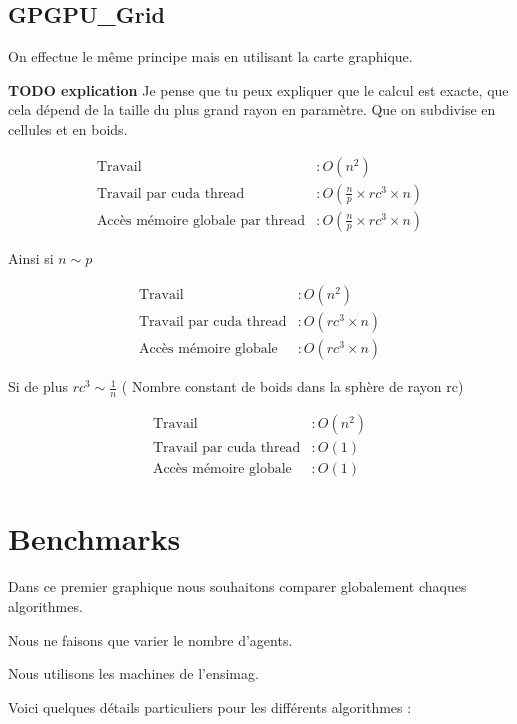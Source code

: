 \documentclass[liens,entete-ensimag,margeCorrection]{ensirapport}
\begin{document}
\subsection{GPGPU\_Grid}
On effectue le même principe mais en utilisant la carte graphique.


\textbf{TODO explication}
Je pense que tu peux expliquer que le calcul est exacte, que cela dépend de la taille du plus grand rayon en paramètre.
Que on subdivise en cellules et en boids.


\begin{align*}
    \text{Travail} &: O\left( n^2 \right) \\
    \text{Travail par cuda thread} &: O\left( \frac n p \times rc^3 \times n \right)  \\
    \text{Accès mémoire globale par thread} &: O\left( \frac n p \times rc^3 \times n \right)
\end{align*}

Ainsi si $n \sim p$

\begin{align*}
    \text{Travail} &: O\left( n^2 \right) \\
    \text{Travail par cuda thread} &: O\left( rc^3 \times n \right)  \\
    \text{Accès mémoire globale} &: O\left( rc^3 \times n \right)
\end{align*}

Si de plus  $ rc^3 \sim \frac 1n$  ( Nombre constant de boids dans la sphère de rayon rc)

\begin{align*}
    \text{Travail} &: O\left( n^2 \right) \\
    \text{Travail par cuda thread} &: O\left( 1 \right)  \\
    \text{Accès mémoire globale} &: O\left( 1\right)
\end{align*}

\section{Benchmarks}

Dans ce premier graphique nous souhaitons comparer globalement chaques algorithmes.

Nous ne faisons que varier le nombre d'agents.

Nous utilisons les machines de l'ensimag.

Voici quelques détails particuliers pour les différents algorithmes :
\end{document}
